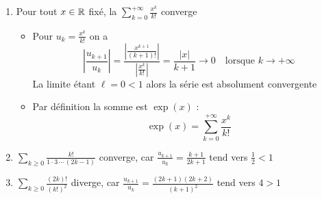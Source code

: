 \begin{frame}

\begin{exemple}
\begin{enumerate}  
  \item\pause Pour tout $x \in \mathbb{R}$ fixé, la 
$\displaystyle\sum_{k=0}^{+\infty} \frac{x^k}{k!}$ converge

\begin{itemize}
\item\pause Pour $u_k = \frac{x^k}{k!}$ on a 
\pause
\vspace*{-1ex}
$$
\left|\frac{u_{k+1}}{u_k}\right|
= \frac{\left|\frac{x^{k+1}}{(k+1)!}\right|}{\left|\frac{x^k}{k!}\right|}
=\frac{|x|}{k+1} \to 0 
\quad \text{lorsque } k \to +\infty
$$
\pause
La limite étant $\ell = 0 < 1$ alors la série est absolument convergente

\item\pause Par définition la somme est $\exp(x)$ : 
\vspace*{-1ex}
$$\exp(x) = \sum_{k=0}^{+\infty} \frac{x^k}{k!}$$
\end{itemize}  
\vspace*{-1ex}
\item\pause $\sum_{k\ge0} \frac{k!}{1\cdot 3\,\cdots\,(2k-1)}$ converge\pause , car $\frac{u_{k+1}}{u_k}=\frac{k+1}{2k+1}$ tend vers $\frac{1}{2}<1$
  
\item\pause $\sum_{k\ge0} \frac{(2k)!}{(k!)^2}$ diverge\pause , car $\frac{u_{k+1}}{u_k}=\frac{(2k+1)(2k+2)}{(k+1)^2}$ tend vers $4>1$
\end{enumerate}
\end{exemple}

\end{frame}


